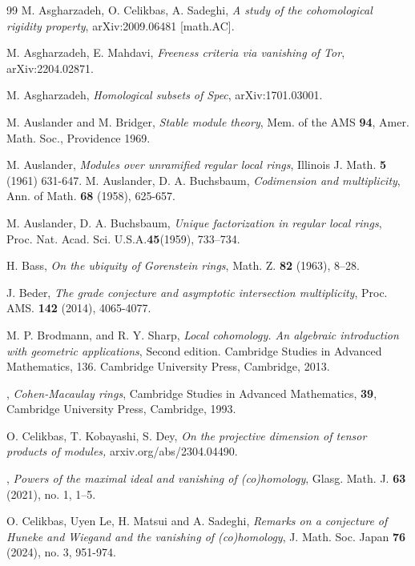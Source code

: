 \documentclass[11.05pt,a4paper]{amsart}
\theoremstyle{definition}
\theoremstyle{remark}
\begin{document}
\begin{thebibliography}{99}
	M. Asgharzadeh, O. Celikbas,  A.
Sadeghi,  \emph{A study of the cohomological rigidity property}, arXiv:2009.06481 [math.AC].

M.  Asgharzadeh, E. Mahdavi, {\it Freeness criteria via vanishing of Tor}, arXiv:2204.02871.

M.  
 Asgharzadeh,
{\it Homological subsets of  Spec}, arXiv:1701.03001.

M. Auslander and M. Bridger, \emph{Stable module theory}, Mem. of
the AMS  {\bf94}, Amer. Math. Soc., Providence 1969.


 M.
 Auslander,  \emph{Modules over unramified regular local rings}, Illinois J. Math. {\bf{5}} (1961)
  631-647.
M. Auslander, D. A. Buchsbaum, \emph{ Codimension and multiplicity}, Ann.
  of Math. {\bf{68}} (1958), 625-657.
  
 M. Auslander, D. A. Buchsbaum, \emph{
 	Unique factorization in regular local rings}, Proc. Nat. Acad. Sci. U.S.A.{\bf45}(1959), 733–734.
 
 
H. Bass, \emph{On the ubiquity of Gorenstein rings},
Math. Z. {\bf{82}} (1963), 8--28.


J. Beder,  \emph{The grade conjecture and asymptotic intersection multiplicity}, Proc. AMS. {\bf{142}} (2014), 4065-4077.


M. P. Brodmann, and  R. Y. Sharp, \emph{Local cohomology. An algebraic introduction with geometric applications}, Second edition. Cambridge Studies in Advanced Mathematics, 136. Cambridge University Press, Cambridge, 2013.

, {\it Cohen-Macaulay rings},  Cambridge Studies in Advanced Mathematics,
{\bf 39},
Cambridge University Press, Cambridge, 1993.

O. Celikbas, T. Kobayashi, S. Dey, {\it On the projective dimension of tensor products of modules,} arxiv.org/abs/2304.04490.


, {\it Powers of the maximal ideal and vanishing of (co)homology}, Glasg. Math. J. {\bf 63} (2021), no. 1, 1–5.

O. Celikbas, Uyen Le,
H.   Matsui and A. Sadeghi, 
{\it Remarks on a conjecture of Huneke and Wiegand and the vanishing of (co)homology},
J. Math. Soc. Japan {\bf76} (2024), no. 3, 951-974.




\end{thebibliography}
\end{document}
